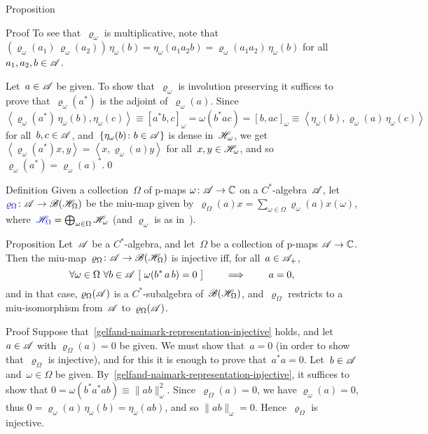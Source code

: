 \documentclass[a]{subfiles}
\begin{document}
\begin{parsec}
\begin{point}{Proposition}
\begin{point}{Proof}
To see that~$\varrho_\omega$ is multiplicative,
note that
$(\varrho_\omega(a_1)\,\varrho_\omega(a_2))\,\eta_\omega(b)
= \eta_\omega(a_1a_2b)=\varrho_\omega(a_1a_2)\,\eta_\omega(b)$
for all~$a_1,a_2,b\in\mathscr{A}$.

Let~$a\in\mathscr{A}$ be given.
To show that~$\varrho_\omega$ is involution preserving
it suffices to prove that~$\varrho_\omega(a^*)$
is the adjoint of~$\varrho_\omega(a)$.
Since~$\left<\varrho_\omega(a^*)\,\eta_\omega(b),\eta_\omega(c)\right>
\equiv [a^*b,c]_\omega = \omega(b^*ac)=[b,ac]_\omega
\equiv \left<\eta_\omega(b),\varrho_\omega(a)\,\eta_\omega(c)\right>$
for all~$b,c\in\mathscr{A}$,
and~$\{\eta_\omega(b)\colon b\in\mathscr{A}\}$
is dense in~$\mathscr{H}_\omega$,
we get~$\left<\varrho_\omega(a^*)x,y\right>=\left<x,\varrho_\omega(a)y\right>$
for all~$x,y\in\mathscr{H}_\omega$,
and so~$\varrho_\omega(a^*)=\varrho_\omega(a)^*$.\qed
\end{point}
\end{point}
\begin{point}{Definition}%
Given a collection~$\Omega$ of p-maps $\omega\colon \mathscr{A}\to\mathbb{C}$
on a $C^*$-algebra~$\mathscr{A}$,
let $\Define{\varrho_\Omega}\colon \scrA\to \scrB(\scrH_\Omega)$
be the miu-map given by~$\varrho_\Omega(a)x 
= \sum_{\omega\in\Omega} \varrho_\omega(a)x(\omega)$,
where~$\Define{\scrH_\Omega}=\bigoplus_{\omega\in\Omega}\scrH_\omega$
(and $\varrho_\omega$ is as in~).
\end{point}
\begin{point}{Proposition}%
Let~$\mathscr{A}$ be a $C^*$-algebra,
and let~$\Omega$ be a collection of p-maps
$\mathscr{A}\to\mathbb{C}$.
Then the miu-map~$\varrho_\Omega\colon \mathscr{A}\to\mathscr{B}(\mathscr{H}_\Omega)$
is injective iff, for all~$a\in \mathscr{A}_{+}$,
\begin{equation}
	\label{gelfand-naimark-representation-injective}
	\forall \omega\in \Omega\ 
	\forall b\in\scrA \ 
	[\ 
	\omega(b^*\,a\,b)=0\ ]
\qquad\implies\qquad
a=0,
\end{equation}
and in that case, $\varrho_\Omega(\mathscr{A})$ is a $C^*$-subalgebra
of~$\mathscr{B}(\mathscr{H}_\Omega)$,
and~$\varrho_\Omega$
restricts to a miu-isomorphism from~$\mathscr{A}$ to~$\varrho_\Omega(\mathscr{A})$.
\begin{point}{Proof}%
Suppose that~\eqref{gelfand-naimark-representation-injective}
holds, and let~$a\in \mathscr{A}$ with $\varrho_\Omega(a)=0$ be given.
We must show that~$a=0$ (in order to show that~$\varrho_\Omega$
is injective),
and for this it is enough to prove that~$a^*a=0$.
Let~$b\in\mathscr{A}$ and~$\omega\in\Omega$ be given.
By~\ref{gelfand-naimark-representation-injective},
it suffices to show that $0=\omega(b^*a^*ab) \equiv \|ab\|_\omega^2$.
Since~$\varrho_\Omega(a)=0$,
we have $\varrho_\omega(a)=0$,
thus $0=\varrho_\omega(a)\,\eta_\omega(b)
=\eta_\omega(ab)$,
and so $\|ab\|_\omega=0$.
Hence~$\varrho_\Omega$ is injective.


\end{point}
\end{point}
\end{parsec}
\end{document}
